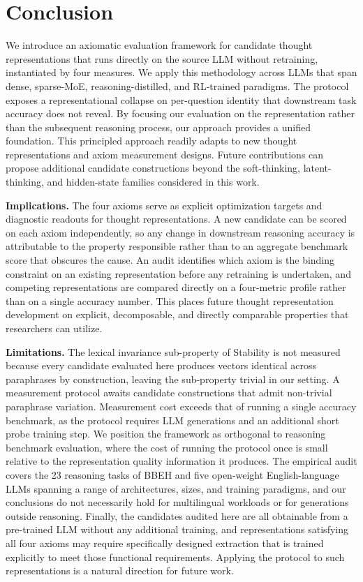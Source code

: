 \section{Conclusion}
\label{conclusion}

We introduce an axiomatic evaluation framework for candidate thought representations that runs directly on the source LLM without retraining, instantiated by four measures. We apply this methodology across LLMs that span dense, sparse-MoE, reasoning-distilled, and RL-trained paradigms. The protocol exposes a representational collapse on per-question identity that downstream task accuracy does not reveal. By focusing our evaluation on the representation rather than the subsequent reasoning process, our approach provides a unified foundation. This principled approach readily adapts to new thought representations and axiom measurement designs. Future contributions can propose additional candidate constructions beyond the soft-thinking, latent-thinking, and hidden-state families considered in this work.

\textbf{Implications.} The four axioms serve as explicit optimization targets and diagnostic readouts for thought representations. A new candidate can be scored on each axiom independently, so any change in downstream reasoning accuracy is attributable to the property responsible rather than to an aggregate benchmark score that obscures the cause. An audit identifies which axiom is the binding constraint on an existing representation before any retraining is undertaken, and competing representations are compared directly on a four-metric profile rather than on a single accuracy number. This places future thought representation development on explicit, decomposable, and directly comparable properties that researchers can utilize.

\textbf{Limitations.}
The lexical invariance sub-property of Stability is not measured
because every candidate evaluated here produces vectors identical
across paraphrases by construction, leaving the sub-property trivial
in our setting. A measurement protocol awaits candidate constructions
that admit non-trivial paraphrase variation. Measurement cost
exceeds that of running a single accuracy benchmark, as the protocol
requires LLM generations and an additional short probe training
step. We position the framework as orthogonal to reasoning benchmark evaluation,
where the cost of running the protocol once is small relative to the
representation quality information it produces. The empirical audit covers
the 23 reasoning tasks of BBEH and five open-weight English-language LLMs
spanning a range of architectures, sizes, and training paradigms, and our
conclusions do not necessarily hold for multilingual workloads or for
generations outside reasoning. Finally, the candidates audited here are
all obtainable from a pre-trained LLM without any additional training, and
representations satisfying all four axioms may require specifically designed extraction that is trained explicitly to meet those functional requirements.
Applying the protocol to such representations is a natural direction for
future work.

